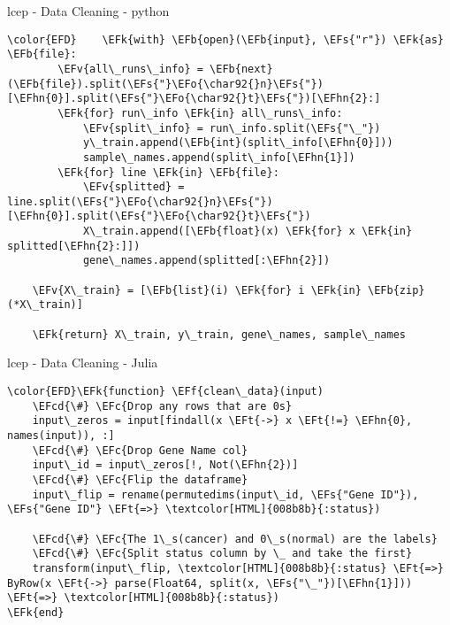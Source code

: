 \documentclass[bigger]{beamer}
\newcommand{\EFc}[1]{\textcolor{EFc}{#1}} %
\newcommand{\EFcd}[1]{\textcolor{EFcd}{#1}} %
\newcommand{\EFs}[1]{\textcolor{EFs}{#1}} %
\newcommand{\EFk}[1]{\textcolor{EFk}{#1}} %
\newcommand{\EFb}[1]{\textcolor{EFb}{#1}} %
\newcommand{\EFf}[1]{\textcolor{EFf}{#1}} %
\newcommand{\EFv}[1]{\textcolor{EFv}{#1}} %
\newcommand{\EFt}[1]{\textcolor{EFt}{#1}} %
\newcommand{\EFo}[1]{\textcolor{EFo}{#1}} %
\newcommand{\EFhn}[1]{\textcolor{EFhn}{\textbf{#1}}} %
\begin{document}
\begin{frame}[label={sec:orgb381656},fragile]{lcep - Data Cleaning - python}
 \footnotesize
\begin{Code}
\begin{Verbatim}
\color{EFD}    \EFk{with} \EFb{open}(\EFb{input}, \EFs{"r"}) \EFk{as} \EFb{file}:
        \EFv{all\_runs\_info} = \EFb{next}(\EFb{file}).split(\EFs{"}\EFo{\char92{}n}\EFs{"})[\EFhn{0}].split(\EFs{"}\EFo{\char92{}t}\EFs{"})[\EFhn{2}:]
        \EFk{for} run\_info \EFk{in} all\_runs\_info:
            \EFv{split\_info} = run\_info.split(\EFs{"\_"})
            y\_train.append(\EFb{int}(split\_info[\EFhn{0}]))
            sample\_names.append(split\_info[\EFhn{1}])
        \EFk{for} line \EFk{in} \EFb{file}:
            \EFv{splitted} = line.split(\EFs{"}\EFo{\char92{}n}\EFs{"})[\EFhn{0}].split(\EFs{"}\EFo{\char92{}t}\EFs{"})
            X\_train.append([\EFb{float}(x) \EFk{for} x \EFk{in} splitted[\EFhn{2}:]])
            gene\_names.append(splitted[:\EFhn{2}])

    \EFv{X\_train} = [\EFb{list}(i) \EFk{for} i \EFk{in} \EFb{zip}(*X\_train)]

    \EFk{return} X\_train, y\_train, gene\_names, sample\_names
\end{Verbatim}
\end{Code}
\end{frame}

\begin{frame}[label={sec:org72d9ab5},fragile]{lcep - Data Cleaning - Julia}
 \footnotesize
\begin{Code}
\begin{Verbatim}
\color{EFD}\EFk{function} \EFf{clean\_data}(input)
    \EFcd{\#} \EFc{Drop any rows that are 0s}
    input\_zeros = input[findall(x \EFt{->} x \EFt{!=} \EFhn{0}, names(input)), :]
    \EFcd{\#} \EFc{Drop Gene Name col}
    input\_id = input\_zeros[!, Not(\EFhn{2})]
    \EFcd{\#} \EFc{Flip the dataframe}
    input\_flip = rename(permutedims(input\_id, \EFs{"Gene ID"}), \EFs{"Gene ID"} \EFt{=>} \textcolor[HTML]{008b8b}{:status})

    \EFcd{\#} \EFc{The 1\_s(cancer) and 0\_s(normal) are the labels}
    \EFcd{\#} \EFc{Split status column by \_ and take the first}
    transform(input\_flip, \textcolor[HTML]{008b8b}{:status} \EFt{=>} ByRow(x \EFt{->} parse(Float64, split(x, \EFs{"\_"})[\EFhn{1}])) \EFt{=>} \textcolor[HTML]{008b8b}{:status})
\EFk{end}
\end{Verbatim}
\end{Code}
\end{frame}
\end{document}
